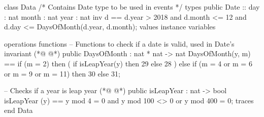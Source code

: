 \begin{vdmpp}[breaklines=true]
class Data
/*
  Contains Date type to be used in events
*/
types
 public Date :: day : nat
          month : nat
          year : nat
  inv d == d.year > 2018 and 
    d.month <= 12 and
    d.day <=  DaysOfMonth(d.year, d.month);
values
instance variables
 
operations
functions
 -- Functions to check if a date is valid, used in Date's invariant
(*@
\label{DaysOfMonth:18}
@*)
 public DaysOfMonth : nat * nat -> nat
 DaysOfMonth(y, m) == 
  if (m = 2) then (
   if isLeapYear(y) then 29
   else 28
  )
  else if (m = 4 or m = 6 or m = 9 or m = 11) then 30
  else 31;
 
 -- Checks if a year is leap year
(*@
\label{isLeapYear:28}
@*)
 public isLeapYear : nat -> bool
 isLeapYear (y) ==
  y mod 4 = 0 and y mod 100 <> 0 or y mod 400 = 0;
traces
end Data
\end{vdmpp}

